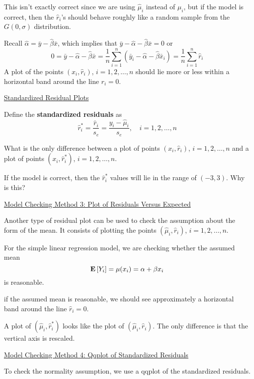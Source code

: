 This isn't exactly correct since we are using $ \hat{\mu}_i $ instead of $ \mu_i $,
but if the model is correct, then the $ \hat{r}_i $'s should behave roughly like a random
sample from the $ G(0,\sigma) $ distribution.

Recall $ \hat{\alpha}=\bar{y}-\hat{\beta}\bar{x} $, which implies that $ \bar{y}-\hat{\alpha}-\hat{\beta}\bar{x}=0 $
or
\[ 0=\bar{y}-\hat{\alpha}-\hat{\beta}\bar{x}=\frac{1}{n} \sum\limits_{i=1}^{n} \left( \bar{y}_i-\hat{\alpha}-\hat{\beta}\bar{x}_i \right)
    =\frac{1}{n} \sum\limits_{i=1}^{n} \hat{r}_i \]
A plot of the points $ \left( x_i,\hat{r}_i \right) $, $ i=1,2,\ldots ,n $
should lie more or less within a horizontal band around the line $ \hat{r}_i=0 $.

\underline{Standardized Residual Plots}
\begin{defbox}
    \begin{definition}
        Define the \textbf{standardized residuals} as
        \[\hat{r}_{i}^{*}=\frac{\hat{r}_{i}}{s_{e}}=\frac{y_{i}-\hat{\mu}_{i}}{s_{e}}, \quad i=1,2, \ldots, n\]
    \end{definition}
\end{defbox}
What is the only difference between a plot of points $ \left( x_i,\hat{r}_i \right) $, $ i=1,2,\ldots ,n $
and a plot of points $ \left( x_i,\hat{r}_i^* \right) $, $ i=1,2,\ldots ,n $.

If the model is correct, then the $ \hat{r}_i^* $ values will lie in the range of $ (-3,3) $. Why is this?

\underline{Model Checking Method 3: Plot of Residuals Versus Expected}

Another type of residual plot can be used to check the assumption about the form of the mean.
It consists of plotting the points $ \left( \hat{\mu}_i,\hat{r}_i \right) $, $ i=1,2,\ldots ,n $.

For the simple linear regression model, we are checking whether the assumed mean
\[ \bm{\mathrm{E}}\left[Y_i\right]=\mu(x_i)=\alpha+\beta x_i \]
is reasonable.

if the assumed mean is reasonable, we should see approximately a horizontal band around the line
$ \hat{r}_i=0 $.

A plot of $ \left( \hat{\mu}_i,\hat{r}_i^* \right) $ looks like the plot of $ \left( \hat{\mu}_i,\hat{r}_i \right) $.
The only difference is that the vertical axis is rescaled.

\underline{Model Checking Method 4: Qqplot of Standardized Residuals}

To check the normality assumption, we use a qqplot of the standardized residuals.

